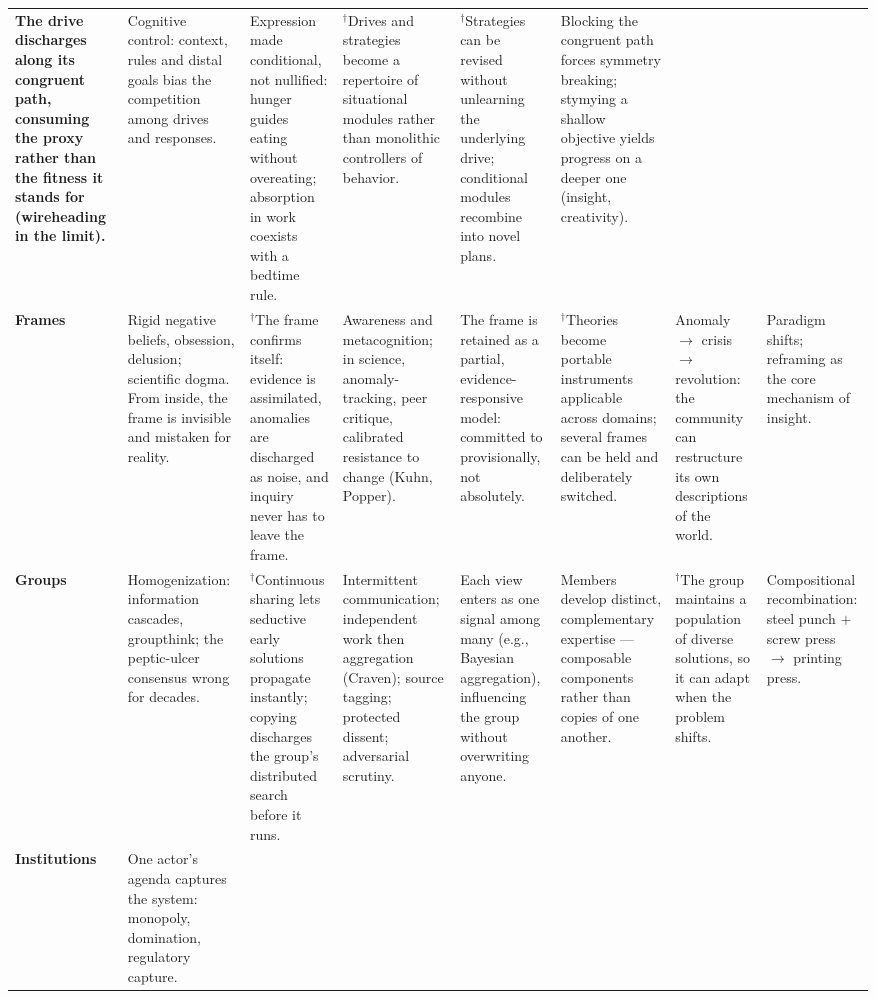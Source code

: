 \documentclass[11pt]{article}
\begin{document}
\begin{landscape}
\begin{table}[p]
\begin{tabularx}{\linewidth}{@{}>{\RaggedRight\arraybackslash\bfseries}p{1.9cm} Y Y Y Y Y Y Y@{}}
The drive discharges along its congruent path, consuming the proxy rather than the fitness it stands for (wireheading in the limit). &
Cognitive control: context, rules and distal goals bias the competition among drives and responses. &
Expression made conditional, not nullified: hunger guides eating without overeating; absorption in work coexists with a bedtime rule. &
$^{\dagger}$Drives and strategies become a repertoire of situational modules rather than monolithic controllers of behavior. &
$^{\dagger}$Strategies can be revised without unlearning the underlying drive; conditional modules recombine into novel plans. &
Blocking the congruent path forces symmetry breaking; stymying a shallow objective yields progress on a deeper one (insight, creativity). \\
\addlinespace
Frames &
Rigid negative beliefs, obsession, delusion; scientific dogma. From inside, the frame is invisible and mistaken for reality. &
$^{\dagger}$The frame confirms itself: evidence is assimilated, anomalies are discharged as noise, and inquiry never has to leave the frame. &
Awareness and metacognition; in science, anomaly-tracking, peer critique, calibrated resistance to change (Kuhn, Popper). &
The frame is retained as a partial, evidence-responsive model: committed to provisionally, not absolutely. &
$^{\dagger}$Theories become portable instruments applicable across domains; several frames can be held and deliberately switched. &
Anomaly $\to$ crisis $\to$ revolution: the community can restructure its own descriptions of the world. &
Paradigm shifts; reframing as the core mechanism of insight. \\
\addlinespace
Groups &
Homogenization: information cascades, groupthink; the peptic-ulcer consensus wrong for decades. &
$^{\dagger}$Continuous sharing lets seductive early solutions propagate instantly; copying discharges the group's distributed search before it runs. &
Intermittent communication; independent work then aggregation (Craven); source tagging; protected dissent; adversarial scrutiny. &
Each view enters as one signal among many (e.g., Bayesian aggregation), influencing the group without overwriting anyone. &
Members develop distinct, complementary expertise --- composable components rather than copies of one another. &
$^{\dagger}$The group maintains a population of diverse solutions, so it can adapt when the problem shifts. &
Compositional recombination: steel punch $+$ screw press $\to$ printing press. \\
\addlinespace
Institutions &
One actor's agenda captures the system: monopoly, domination, regulatory capture. &

\end{tabularx}
\end{table}
\end{landscape}
\end{document}
